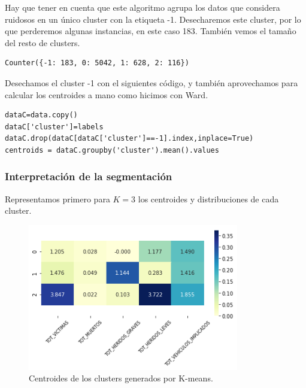 \documentclass[oneside]{book}
\begin{document}
Hay que tener en cuenta que este algoritmo agrupa los datos que
considera ruidosos en un único cluster con la etiqueta
-1. Desecharemos este cluster, por lo que perderemos algunas
instancias, en este caso 183. También vemos el tamaño del resto de
clusters.
\begin{verbatim}
Counter({-1: 183, 0: 5042, 1: 628, 2: 116})
\end{verbatim}
Desechamos el cluster -1 con el siguientes código, y también
aprovechamos para calcular los centroides a mano como hicimos con
Ward.
\begin{verbatim}
dataC=data.copy()
dataC['cluster']=labels
dataC.drop(dataC[dataC['cluster']==-1].index,inplace=True)
centroids = dataC.groupby('cluster').mean().values
\end{verbatim}

\subsubsection{Interpretación de la segmentación}

Representamos primero para $K=3$ los centroides y distribuciones de
cada cluster.

\begin{figure}[H]
  \centering
  \includegraphics[width=92mm]{figures/accidentes/k-means2centroids}
  \caption{Centroides de los clusters generados por K-means.}
  \label{fig:k-means2centroids}
\end{figure}
\end{document}
